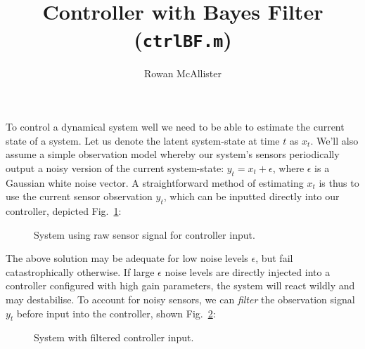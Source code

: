 \documentclass[9pt]{article}
\title{Controller with Bayes Filter (\texttt{ctrlBF.m})}
\author{Rowan McAllister}
\newcommand{\E}{{\mathbb E}}
\newcommand{\now}[1]{#1_t}                  %
\begin{document}
\maketitle

\tableofcontents
\newpage

To control a dynamical system well we need to be able to estimate the current state of a system.
Let us denote the latent system-state at time $t$ as $\now{x}$.
We'll also assume a simple observation model
whereby our system's sensors periodically output a noisy version of the current system-state:
$\now{y} = \now{x} + \epsilon$, where $\epsilon$ is a Gaussian white noise vector.
%
A straightforward method of estimating $\now{x}$ is thus to use the current sensor observation $\now{y}$,
which can be inputted directly into our controller, depicted Fig.~\ref{fig:unfilteredSystem}:
%
\begin{figure}[h]
\centering
{}
\caption{System using raw sensor signal for controller input.}
\label{fig:unfilteredSystem}
\end{figure}

The above solution may be adequate for low noise levels $\epsilon$,
but fail catastrophically otherwise.
If large $\epsilon$ noise levels are directly injected into a controller configured with high gain parameters,
the system will react wildly and may destabilise.
To account for noisy sensors, we can \textit{filter} the observation signal $\now{y}$ before input into the controller,
shown Fig.~\ref{fig:filteredSystem}:
%
\begin{figure}[h]
\centering
{}
\caption{System with filtered controller input.}
\label{fig:filteredSystem}
\end{figure}
\end{document}
